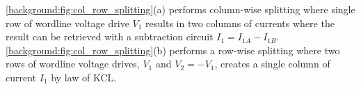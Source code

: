 \autoref{background:fig:col_row_splitting}(a) performs column-wise splitting where single row of wordline voltage drive $V_1$ results in two columns of currents where the result can be retrieved with a subtraction circuit $I_1 = I_{1A} - I_{1B}$. \autoref{background:fig:col_row_splitting}(b) performs a row-wise splitting where two rows of wordline voltage drives, $V_1$ and $V_2 = - V_1$, creates a single column of current $I_1$ by law of \ac{KCL}.






